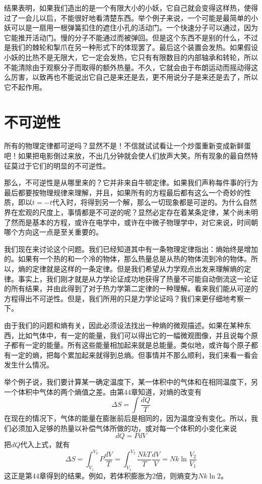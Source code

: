 结果表明，如果我们造出的是一个有限大小的小妖，它自己就会变得这样热，使得过了一会儿以后，不能很好地看清楚东西。举个例子来说，一个可能是最简单的小妖可以是一扇用一根弹簧扣住的遮住小孔的活动门。一个快速分子可以通过，因为它能推开活动门。慢的分子不能通过而被弹回。但是这个东西不是别的什么，不过是我们的棘轮和掣爪在另一种形式下的体现罢了。最后这个装置会发热。如果假设小妖的比热不是无限大，它一定会发热，它只有有限数目的内部轴承和转轮，所以不能清除由于观察分子而取得的额外热量。不久，它就会由于布朗运动而摇动得这么厉害，以致再也不能说出它自己是来还是去，更不用说分子是来还是去了，所以它不起作用。

\section{不可逆性}

所有的物理定律都可逆吗？显然不是！不信就试试看让一个炒蛋重新变成新鲜蛋吧！如果把电影倒过来放，不出几分钟就会使人们放声大笑。所有现象的最自然特征莫过于它们的明显的不可逆性。

那么，不可逆性是从哪里来的？它并非来自牛顿定律。如果我们声称每件事的行为最后都要按物理规律来理解，并且，如果所有的方程最后都有这么一个奇妙的性质，即以$t=-t$代入时，将得到另一个解，那么一切现象都是可逆的。为什么自然界在宏观的尺度上，事情都是不可逆的呢？显然必定存在着某条定律，某个尚未明了然而是基本的方程，或许在电学中，或许在中微子物理学中，对它来说，时间朝哪个方向这一点是至关重要的。

我们现在来讨论这个问题。我们已经知道其中有一条物理定律指出：熵始终是增加的。如果有一个热的和一个冷的物体，那么热量总是从热的物体流到冷的物体。所以，熵的定律就是这样的一条定律。但是我们希望从力学观点出发来理解熵的定律。事实上，我们刚才就是从力学论证成功地获得了热量不可能自动倒流这一论证的所有结果，并由此得到了对于热力学第二定律的一种理解。看来我们能从可逆的方程得出不可逆性。但是，我们所用的只是力学论证吗？我们来更仔细地考察一下。

由于我们的问题和熵有关，因此必须设法找出一种熵的微观描述。如果在某种东西，比如气体中，有一定的能量，我们可以得出它的一幅微观图像，并且说每个原子都有一定的能量。所有这些能量相加起来就是总能量。类似地，或许每个原子都有一定的熵，把每个累加起来就得到总熵。但事情并不那么顺利，我们来看一看会发生什么情况。

举个例子说，我们要计算某一确定温度下，某一体积中的气体和在相同温度下，另一个体积中气体的两个熵值之差。由第44章知道，对熵的改变有
\begin{equation*}
    \Delta S = \int \frac{dQ}{T}
\end{equation*}
在现在的情况下，气体的能量在膨胀前后是相同的，因为温度没有变化。所以，我们必须加入足够的热量以补偿气体所做的功，或对每一个体积的小变化来说
\begin{equation*}
    dQ = PdV
\end{equation*}
把$dQ$代入上式，就有
\begin{equation*}
    \Delta S = \int_{V_1}^{V_2}P\frac{dV}{T} = \int_{V_1}^{V_2} \frac{NkT}{T}\frac{dV}{V}=Nk\ln\frac{V_2}{V_1}
\end{equation*}
这正是第44章得到的结果。例如，若体积膨胀为2倍，则熵变为$Nk \ln 2$。

